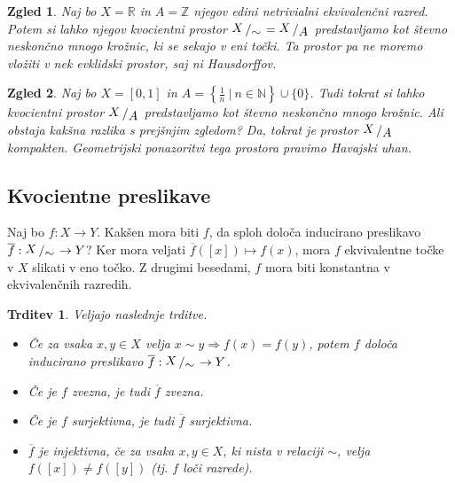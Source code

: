 \documentclass[10pt, a4paper]{article}
\newtheorem{trditev}[izr]{Trditev}
\newtheorem{zgled}{Zgled}[section]
\newcommand{\N}{\mathbb {N}}
\newcommand{\Z}{\mathbb {Z}}
\newcommand{\R}{\mathbb {R}}
\newcommand{\quot}[2]{{\raisebox{0.1em}{$#1$}\left/\raisebox{-0.2em}{$#2$}\right.}}
\begin{document}
\begin{zgled}
    Naj bo $X = \R$ in $A = \Z$ njegov edini netrivialni ekvivalenčni razred.
    Potem si lahko njegov kvocientni prostor $\quot{X}{\sim} = \quot{X}{A}$ predstavljamo
    kot števno neskončno mnogo krožnic, ki se sekajo v eni točki. 
    Ta prostor pa ne moremo vložiti v nek evklidski prostor, saj ni Hausdorffov.
\end{zgled}

\begin{zgled}
    Naj bo $X = [0, 1]$ in $A = \left\lbrace \frac{1}{n}\ \Big|\ n \in \N \right\rbrace \cup \{0\}$.
    Tudi tokrat si lahko kvocientni prostor $\quot{X}{A}$ predstavljamo kot 
    števno neskončno mnogo krožnic. Ali obstaja kakšna razlika s prejšnjim zgledom?
    Da, tokrat je prostor $\quot{X}{A}$ kompakten.
    Geometrijski ponazoritvi tega prostora pravimo Havajski uhan.
    \begin{center}
    \end{center}
\end{zgled}

\subsection{Kvocientne preslikave}

Naj bo $f: X \to Y$. Kakšen mora biti $f$, da sploh določa inducirano preslikavo 
$\overline{f}: \quot{X}{\sim} \to Y$? Ker mora veljati $\overline{f}([x]) \mapsto f(x)$,
mora $f$ ekvivalentne točke v $X$ slikati v eno točko. Z drugimi besedami, $f$ mora biti konstantna v ekvivalenčnih razredih.

\begin{trditev}
    Veljajo naslednje trditve.
    \begin{itemize}
        \item Če za vsaka $x, y \in X$ velja $x \sim y \Rightarrow f(x) = f(y)$,
        potem $f$ določa inducirano preslikavo $\overline{f}: \quot{X}{\sim} \to Y$.
        \item Če je $f$ zvezna, je tudi $\overline{f}$ zvezna.
        \item Če je $f$ surjektivna, je tudi $\overline{f}$ surjektivna.
        \item $\overline{f}$ je injektivna, če za vsaka $x, y \in X$, ki nista v relaciji $\sim$, velja $f([x]) \neq f([y])$
        (tj. $f$ loči razrede).
    \end{itemize}
\end{trditev}
\end{document}
